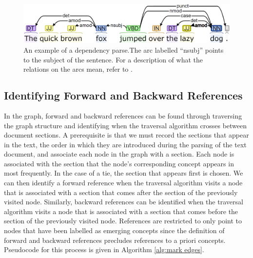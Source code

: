 \documentclass[12pt]{article}
\theoremstyle{grammarstyle}
\begin{document}
\begin{figure}
    \centering
    \includegraphics[width=\linewidth]{reports/technical_report/latex/figures/dependency_parse.png}
    \caption{An example of a dependency parse.\protect\footnotemark The arc labelled ``nsubj'' points to the subject of the sentence.
    For a description of what the relations on the arcs mean, refer to \citep{martin2018speech}.}
    \label{fig:dependency_parse_example}
\end{figure}


\subsection{Identifying Forward and Backward References} \label{sec:identifying_references}
In the graph, forward and backward references can be found through traversing the graph structure and identifying when the traversal algorithm crosses between document sections. A prerequisite is that we must record the sections that appear in the text, the order in which they are introduced during the parsing of the text document, and associate each node in the graph with a section. Each node is associated with the section that the node's corresponding concept appears in most frequently. In the case of a tie, the section that appears first is chosen. We can then identify a forward reference when the traversal algorithm visits a node that is associated with a section that comes after the section of the previously visited node. Similarly, backward references can be identified when the traversal algorithm visits a node that is associated with a section that comes before the section of the previously visited node. References are restricted to only point to nodes that have been labelled as emerging concepts since the definition of forward and backward references precludes references to a priori concepts. Pseudocode for this process is given in Algorithm \ref{alg:mark edges}.

\DontPrintSemicolon
\end{document}

